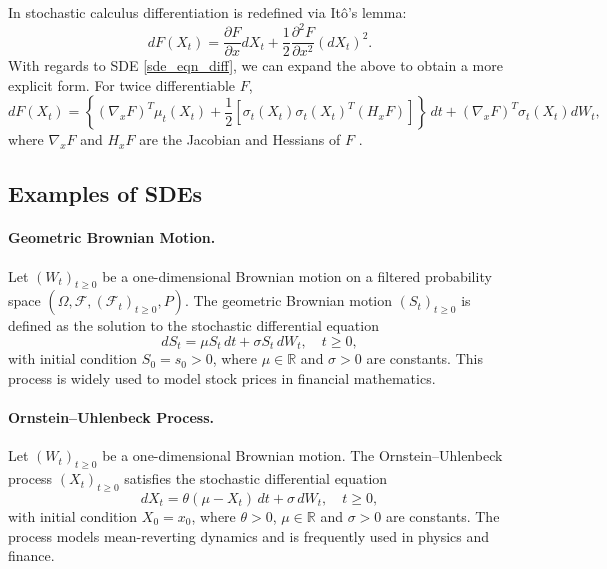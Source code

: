 \documentclass[11pt, twoside]{report}
\begin{document}
In stochastic calculus differentiation is redefined via It\^{o}'s lemma:
\begin{equation} \label{ito_lem}
    dF(X_t) = \frac{\partial F}{\partial x} dX_t + \frac{1}{2} \frac{\partial^2 F}{\partial x^2} (dX_t)^2.
\end{equation}
With regards to SDE \eqref{sde_eqn_diff}, we can expand the above to obtain a more explicit form. For twice differentiable $F$,
\begin{equation} \label{ito_lem_exp}
    dF(X_t) = \left\{(\nabla_x F)^T \mu_t(X_t) + \frac{1}{2} [\sigma_t(X_t)\sigma_t(X_t)^T (H_x F) ] \right\} \,dt + (\nabla_x F)^T \sigma_t(X_t) dW_t,
\end{equation}
where $\nabla_x F$ and $H_x F$ are the Jacobian and Hessians of $F$ \cite{pavliotis_book}.

\subsection{Examples of SDEs}

\paragraph{Geometric Brownian Motion.}
Let $(W_t)_{t\ge0}$ be a one-dimensional Brownian motion on a filtered probability
space $(\Omega,\mathcal F,(\mathcal F_t)_{t\ge0},P)$. The geometric Brownian motion
$(S_t)_{t\ge0}$ is defined as the solution to the stochastic differential equation
\begin{equation}
dS_t = \mu S_t\,dt + \sigma S_t\,dW_t, \quad t \ge 0,
\end{equation}
with initial condition $S_0 = s_0 > 0$, where $\mu \in \mathbb{R}$ and $\sigma > 0$
are constants. This process is widely used to model stock prices in financial
mathematics.

\paragraph{Ornstein--Uhlenbeck Process.}
Let $(W_t)_{t\ge0}$ be a one-dimensional Brownian motion. The Ornstein--Uhlenbeck
process $(X_t)_{t\ge0}$ satisfies the stochastic differential equation
\begin{equation}
dX_t = \theta(\mu - X_t)\,dt + \sigma\,dW_t, \quad t \ge 0,
\end{equation}
with initial condition $X_0 = x_0$, where $\theta > 0$, $\mu \in \mathbb{R}$ and
$\sigma > 0$ are constants. The process models mean-reverting dynamics and is
frequently used in physics and finance.
\end{document}
